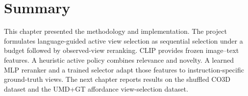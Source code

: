 \section{Summary}

This chapter presented the methodology and implementation. The project formulates language-guided active view selection as sequential selection under a budget followed by observed-view reranking. CLIP provides frozen image--text features. A heuristic active policy combines relevance and novelty. A learned MLP reranker and a trained selector adapt those features to instruction-specific ground-truth views. The next chapter reports results on the shuffled CO3D dataset and the UMD+GT affordance view-selection dataset.
